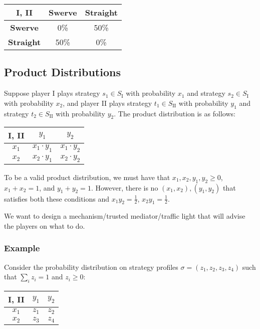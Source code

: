 \begin{center}
	\begin{tabular}{|c|c|c|}
		\hline
		\textbf{I, II}    & \textbf{Swerve} & \textbf{Straight} \\ \hline
		\textbf{Swerve}   & 0\% & 50\% \\ \hline
		\textbf{Straight} & 50\% & 0\% \\ \hline
	\end{tabular}
\end{center}

\subsection{Product Distributions}

Suppose player I plays strategy $s_1 \in S_\text{I}$ with probability $x_1$ and
strategy $s_2 \in S_\text{I}$ with probability $x_2$, and player II plays
strategy $t_1 \in S_\text{II}$ with probability $y_1$ and strategy $t_2 \in
S_\text{II}$ with probability $y_2$. The product distribution is as follows:

\begin{center}
	\begin{tabular}{|c|c|c|}
		\hline
		\textbf{I, II} & $y_1$           & $y_2$ \\ \hline
		$x_1$          & $x_1 \cdot y_1$ & $x_1 \cdot y_2$ \\ \hline
		$x_2$          & $x_2 \cdot y_1$ & $x_2 \cdot y_2$ \\ \hline
	\end{tabular}
\end{center}

To be a valid product distribution, we must have that $x_1, x_2, y_1, y_2 \ge
0$, $x_1 + x_2 = 1$, and $y_1 + y_2 = 1$. However, there is no $(x_1, x_2),
(y_1, y_2)$ that satisfies both these conditions and $x_1 y_2 = \frac{1}{2}$,
$x_2 y_1 = \frac{1}{2}$.

We want to design a mechanism/trusted mediator/traffic light that will advise
the players on what to do.

\subsubsection{Example}

Consider the probability distribution on strategy profiles $\sigma = (z_1, z_2,
z_3, z_4)$ such that $\sum_i z_i = 1$ and $z_i \ge 0$:

\begin{center}
	\begin{tabular}{|c|c|c|}
		\hline
		\textbf{I, II} & $y_1$ & $y_2$ \\ \hline
		$x_1$          & $z_1$ & $z_2$ \\ \hline
		$x_2$          & $z_3$ & $z_4$ \\ \hline
	\end{tabular}
\end{center}

